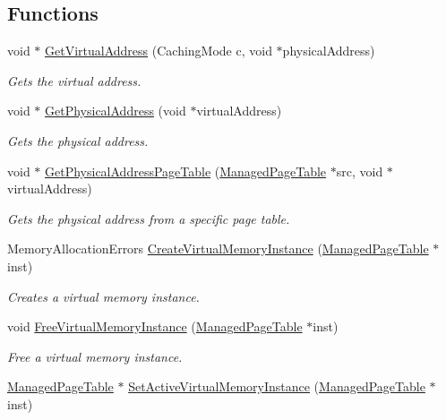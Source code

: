 \subsection*{Functions}
\begin{DoxyCompactItemize}
\item 
void $\ast$ \hyperlink{group__memory__hal_gadb5f3831d980612868dbb74756f07877}{Get\+Virtual\+Address} (Caching\+Mode c, void $\ast$physical\+Address)
\begin{DoxyCompactList}\small\item\em Gets the virtual address. \end{DoxyCompactList}\item 
void $\ast$ \hyperlink{group__memory__hal_ga068e21628a7e3cb106bbde7da70c03f0}{Get\+Physical\+Address} (void $\ast$virtual\+Address)
\begin{DoxyCompactList}\small\item\em Gets the physical address. \end{DoxyCompactList}\item 
void $\ast$ \hyperlink{group__memory__hal_gafe782bc6705018a08927bb39a225850a}{Get\+Physical\+Address\+Page\+Table} (\hyperlink{structManagedPageTable}{Managed\+Page\+Table} $\ast$src, void $\ast$virtual\+Address)
\begin{DoxyCompactList}\small\item\em Gets the physical address from a specific page table. \end{DoxyCompactList}\item 
Memory\+Allocation\+Errors \hyperlink{group__memory__hal_gadbb8e6aa6429764d392f2a7f21f862b9}{Create\+Virtual\+Memory\+Instance} (\hyperlink{structManagedPageTable}{Managed\+Page\+Table} $\ast$inst)
\begin{DoxyCompactList}\small\item\em Creates a virtual memory instance. \end{DoxyCompactList}\item 
void \hyperlink{group__memory__hal_gad6748d1395a14d4f9c85dacad9f69c57}{Free\+Virtual\+Memory\+Instance} (\hyperlink{structManagedPageTable}{Managed\+Page\+Table} $\ast$inst)
\begin{DoxyCompactList}\small\item\em Free a virtual memory instance. \end{DoxyCompactList}\item 
\hyperlink{structManagedPageTable}{Managed\+Page\+Table} $\ast$ \hyperlink{group__memory__hal_ga0b3ca6ba77c946090486ed7623b02f3a}{Set\+Active\+Virtual\+Memory\+Instance} (\hyperlink{structManagedPageTable}{Managed\+Page\+Table} $\ast$inst)

\end{DoxyCompactItemize}
